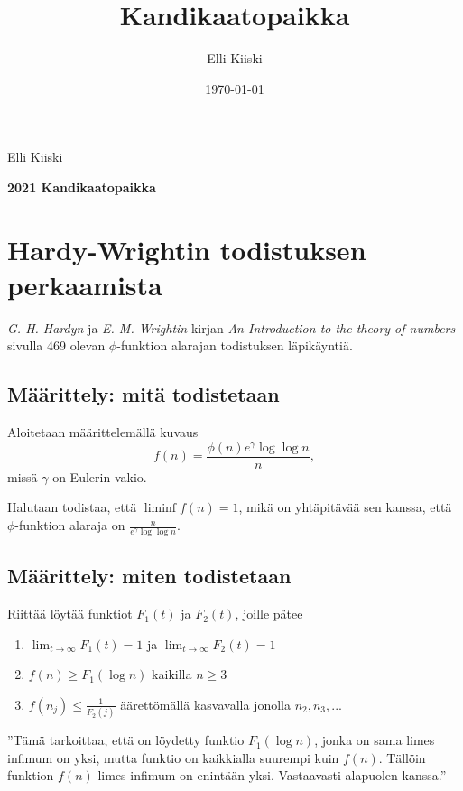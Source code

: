 \documentclass{article}
\title{Kandikaatopaikka}
\author{Elli Kiiski}
\date{\today}
\theoremstyle{definition}
\begin{document}
{\large
Elli Kiiski
\par
\textbf{2021 Kandikaatopaikka}
}
\vspace{0.5cm}

\section{Hardy-Wrightin todistuksen perkaamista}

\textit{G. H. Hardyn} ja \textit{E. M. Wrightin} kirjan \textit{An Introduction to the theory of numbers} sivulla 469 olevan $\phi$-funktion alarajan todistuksen läpikäyntiä.

\subsection{Määrittely: mitä todistetaan}

Aloitetaan määrittelemällä kuvaus
\begin{equation*}
    f(n)= \frac{\phi(n)e^\gamma \log\log n}{n},
\end{equation*}
missä $\gamma$ on Eulerin vakio.


Halutaan todistaa, että $\liminf f(n)=1$, mikä on yhtäpitävää sen kanssa, että $\phi$-funktion alaraja on $\frac{n}{e^\gamma \log\log n}$.

\subsection{Määrittely: miten todistetaan}

Riittää löytää funktiot $F_1(t)$ ja $F_2(t)$, joille pätee
\begin{enumerate}
\label{ehdot}
    \item $\lim_{t\rightarrow \infty} F_1(t) = 1$ ja $\lim_{t\rightarrow \infty} F_2(t) = 1$
    \item $f(n) \geq F_1(\log n)$ kaikilla $n\geq 3$
    \item $f(n_j) \leq \frac{1}{F_2(j)}$ äärettömällä kasvavalla jonolla $n_2, n_3,...$
\end{enumerate}

''Tämä tarkoittaa, että on löydetty funktio $F_1(\log n)$, jonka on sama limes infimum on yksi, mutta funktio on kaikkialla suurempi kuin $f(n)$. Tällöin funktion $f(n)$ limes infimum on enintään yksi. Vastaavasti alapuolen kanssa.''
\end{document}
